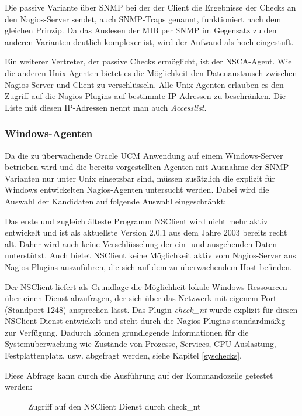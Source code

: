 Die passive Variante über \gls{SNMP} bei der der Client die Ergebnisse der Checks an den Nagios-Server sendet, auch \gls{SNMP}-Traps genannt, funktioniert nach dem gleichen Prinzip.
Da das Auslesen der \gls{MIB} per \gls{SNMP} im Gegensatz zu den anderen Varianten deutlich komplexer ist, wird der Aufwand als hoch eingestuft.

Ein weiterer Vertreter, der passive Checks ermöglicht, ist der \gls{NSCA}-Agent.
Wie die anderen Unix-Agenten bietet es die Möglichkeit den Datenaustausch zwischen Nagios-Server und Client zu verschlüsseln.
Alle Unix-Agenten erlauben es den Zugriff auf die Nagios-Plugins auf bestimmte \gls{IP}-Adressen zu beschränken.
Die Liste mit diesen \gls{IP}-Adressen nennt man auch \textit{Accesslist}.

\subsubsection{Windows-Agenten}
Da die zu überwachende Oracle UCM Anwendung auf einem Windows-Server betrieben wird und die bereits vorgestellten Agenten mit Ausnahme der \gls{SNMP}-Varianten nur unter Unix einsetzbar sind, müssen zusätzlich die explizit für Windows entwickelten Nagios-Agenten untersucht werden.
Dabei wird die Auswahl der Kandidaten auf folgende Auswahl eingeschränkt:



Das erste und zugleich älteste Programm NSClient wird nicht mehr aktiv entwickelt und ist als aktuellste Version 2.0.1 aus dem Jahre 2003 bereits recht alt.
Daher wird auch keine Verschlüsselung der ein- und ausgehenden Daten unterstützt.
Auch bietet NSClient keine Möglichkeit aktiv vom Nagios-Server aus Nagios-Plugins auszuführen, die sich auf dem zu überwachendem Host befinden.

Der NSClient liefert als Grundlage die Möglichkeit lokale Windows-Ressourcen über einen Dienst abzufragen, der sich über das Netzwerk mit eigenem Port (Standport 1248) ansprechen lässt.
Das Plugin \textit{check\_nt} wurde explizit für diesen NSClient-Dienst entwickelt und steht durch die Nagios-Plugins standardmäßig zur Verfügung.
Dadurch können grundlegende Informationen für die Systemüberwachung wie Zustände von Prozesse, Services, CPU-Auslastung, Festplattenplatz, usw. abgefragt werden, siehe Kapitel \ref{syschecks}.

Diese Abfrage kann durch die Ausführung auf der Kommandozeile getestet werden:

\begin{figure}[ht]
	\centering
		\caption{Zugriff auf den NSClient Dienst durch check\_nt}
		\label{fig:cknt}
\end{figure}

